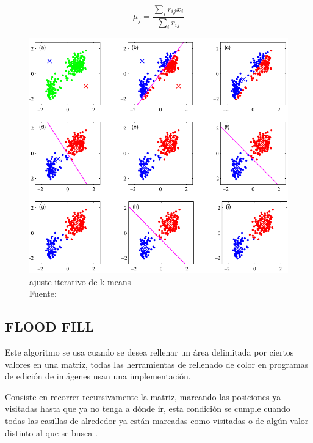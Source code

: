         	\begin{equation}
        		\mu_j = \frac{\sum_{i}r_{ij}x_i}{\sum_{i}r_{ij}}
        	\end{equation}
        
        	\begin{figure}[H]
        		\centering
        		\includegraphics[scale=0.5]{imagenes/kmeans}
        		\caption[Ajuste iterativo de k-means]{ajuste iterativo de k-means\\Fuente: \citep{bishop}}
        	\end{figure}
        \subsection{FLOOD FILL}
        	Este algoritmo se usa cuando se desea rellenar un área delimitada por ciertos valores en una matriz, todas las herramientas de rellenado de color en programas de edición de imágenes usan una implementación.
        	
        	Consiste en recorrer recursivamente la matriz, marcando las posiciones ya visitadas hasta que ya no tenga a dónde ir, esta condición se cumple cuando todas las casillas de alrededor ya están marcadas como visitadas o de algún valor distinto al que se busca \citep{halim2013competitive}.\\
        	

